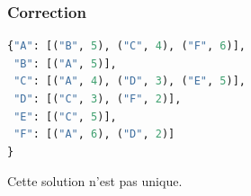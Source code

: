 \documentclass[svgnames,11pt]{beamer}
\begin{document}
\begin{frame}[fragile]
    \frametitle{Correction}

    \begin{center}
        \begin{lstlisting}[language=Python , basicstyle=\ttfamily\small, xleftmargin=2em, xrightmargin=2em]
{"A": [("B", 5), ("C", 4), ("F", 6)],
 "B": [("A", 5)],
 "C": [("A", 4), ("D", 3), ("E", 5)],
 "D": [("C", 3), ("F", 2)],
 "E": [("C", 5)],
 "F": [("A", 6), ("D", 2)]
}
\end{lstlisting}
        \end{center}   
\begin{aretenir}[Remarque]
Cette solution n'est pas unique.
\end{aretenir}
\end{frame}
\end{document}
